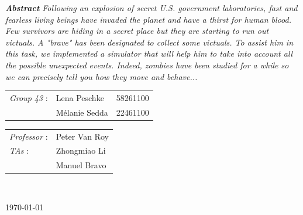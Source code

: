 \documentclass[11pt,a4paper]{article}
\begin{document}
\begin{titlepage}
\emph{\textbf{Abstract} Following an explosion of secret U.S. government laboratories, fast and fearless living beings have invaded the planet and have a thirst for human blood. Few survivors are hiding in a secret place but they are starting to run out victuals. A "brave" has been designated to collect some victuals. To assist him in this task, we implemented a simulator that will help him to take into account all the possible unexpected events. Indeed, zombies have been studied for a while so we can precisely tell you how they move and behave...}\\[0.9cm]


\begin{multicols}{2}
\large
\begin{centering}
\end{centering}
{\begin{tabular}{lll}
\textit{Group 43}  : & Lena Peschke & 58261100\\
        		     & Mélanie Sedda & 22461100 \\
\end{tabular}}

\normalsize
{\begin{tabular}{ll}
\textit{Professor}  : & Peter Van Roy \\
\textit{TAs} 		: & Zhongmiao Li \\
					  & Manuel Bravo \\
\end{tabular}}
\\[1cm]
\end{multicols}

{\normalsize \today}\\[0.6cm] %





\newpage

\end{titlepage}



\end{document}
